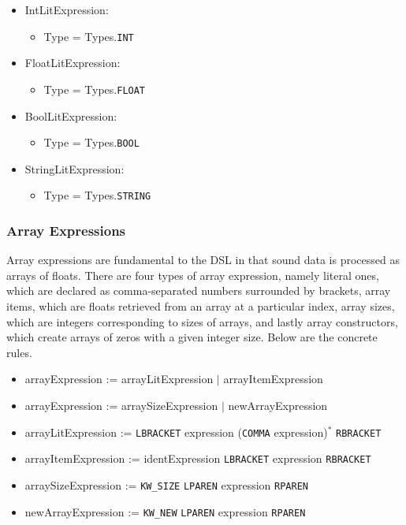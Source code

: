 \begin{itemize}
	\item IntLitExpression:
		\begin{itemize}
			\item Type = Types.\texttt{INT}
		\end{itemize}
	\item FloatLitExpression:
		\begin{itemize}
			\item Type = Types.\texttt{FLOAT}
		\end{itemize}
	\item BoolLitExpression:
		\begin{itemize}
			\item Type = Types.\texttt{BOOL}
		\end{itemize}
	\item StringLitExpression:
		\begin{itemize}
			\item Type = Types.\texttt{STRING}
		\end{itemize}
\end{itemize}

\subsubsection{Array Expressions}

Array expressions are fundamental to the DSL in that sound data is processed as arrays of floats. There are four types of array expression, namely literal ones, which are declared as comma-separated numbers surrounded by brackets, array items, which are floats retrieved from an array at a particular index, array sizes, which are integers corresponding to sizes of arrays, and lastly array constructors, which create arrays of zeros with a given integer size. Below are the concrete rules.

\begin{itemize}
	\item arrayExpression := arrayLitExpression $|$ arrayItemExpression
	\item arrayExpression := arraySizeExpression $|$ newArrayExpression
	\item arrayLitExpression := \texttt{LBRACKET} expression (\texttt{COMMA} expression)$^*$ \texttt{RBRACKET}
	\item arrayItemExpression := identExpression \texttt{LBRACKET} expression \texttt{RBRACKET}
	\item arraySizeExpression := \texttt{KW\_SIZE} \texttt{LPAREN} expression \texttt{RPAREN}
	\item newArrayExpression := \texttt{KW\_NEW} \texttt{LPAREN} expression \texttt{RPAREN}
\end{itemize}

